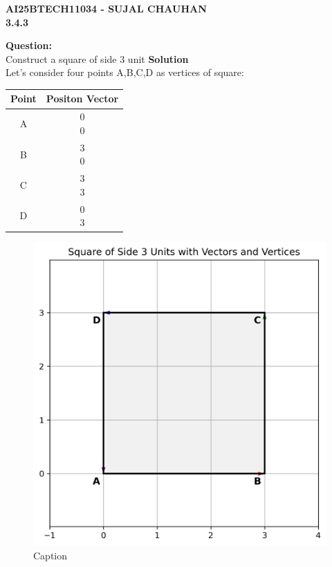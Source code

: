 \documentclass[12pt]{article}
\begin{document}
\newpage
\begin{center}
\textbf{\Large AI25BTECH11034 - SUJAL CHAUHAN }\\
\textbf{3.4.3}
\end{center}

\textbf{Question:}\\
Construct a square of side 3 unit
\vspace{1cm}
\textbf{Solution}\\
Let's consider four points A,B,C,D as vertices of square:
\begin{center}
    \begin{tabular}{|c|c|} \hline
       Point  & Positon Vector \\ \hline
       A  & \myvec{0 \\ 0} \\ \hline
       B  & \myvec{3 \\ 0} \\ \hline
       C  & \myvec{3\\ 3} \\ \hline
       D  & \myvec{0 \\ 3} \\ \hline
    \end{tabular}
\end{center}

\begin{figure}[h]
    \centering
    \includegraphics[width=0.5\linewidth]{figures/square_plot.png}
    \caption{Caption}
    \label{square}
\end{figure}
\end{document}
